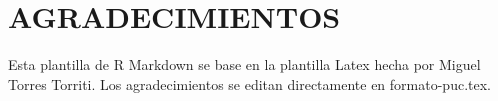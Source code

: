 \documentclass[12pt,reqno,oneside,pdftex]{puctesis} %
\begin{document}




\chapter*{AGRADECIMIENTOS}
Esta plantilla de R Markdown se base en la plantilla Latex hecha por
Miguel Torres Torriti. Los agradecimientos se editan directamente en formato-puc.tex.
\par


\cleardoublepage %



\tableofcontents
\listoffigures          
\listoftables           
\cleardoublepage %
\end{document}
